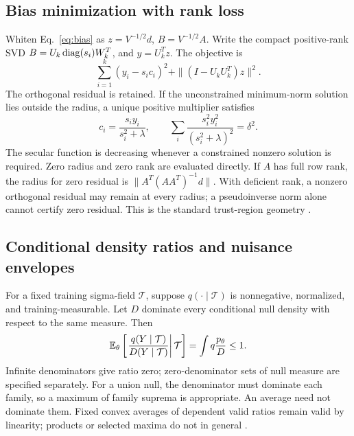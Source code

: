 \subsection{Bias minimization with rank loss}

Whiten Eq.~\eqref{eq:bias} as $z=V^{-1/2}d$, $B=V^{-1/2}A$. Write the compact positive-rank SVD $B=U_k\operatorname{diag}(s_i)W_k^T$, and $y=U_k^Tz$. The objective is
\begin{equation}
 \sum_{i=1}^k(y_i-s_ic_i)^2+
 \|(I-U_kU_k^T)z\|^2.
\end{equation}
The orthogonal residual is retained. If the unconstrained minimum-norm solution lies outside the radius, a unique positive multiplier satisfies
\begin{equation}
 c_i=\frac{s_iy_i}{s_i^2+\lambda},\qquad
 \sum_i\frac{s_i^2y_i^2}{(s_i^2+\lambda)^2}=\delta^2.
\end{equation}
The secular function is decreasing whenever a constrained nonzero solution is required. Zero radius and zero rank are evaluated directly. If $A$ has full row rank, the radius for zero residual is $\|A^T(AA^T)^{-1}d\|$. With deficient rank, a nonzero orthogonal residual may remain at every radius; a pseudoinverse norm alone cannot certify zero residual. This is the standard trust-region geometry \cite{MoreSorensen1983}.

\subsection{Conditional density ratios and nuisance envelopes}

For a fixed training sigma-field $\mathcal T$, suppose $q(\cdot\mid\mathcal T)$ is nonnegative, normalized, and training-measurable. Let $D$ dominate every conditional null density with respect to the same measure. Then
\begin{equation}
 \mathbb E_\theta\left[\left.\frac{q(Y\mid\mathcal T)}{D(Y\mid\mathcal T)}\right|\mathcal T\right]
 =\int q\frac{p_\theta}{D}\leq1.
\end{equation}
Infinite denominators give ratio zero; zero-denominator sets of null measure are specified separately. For a union null, the denominator must dominate each family, so a maximum of family suprema is appropriate. An average need not dominate them. Fixed convex averages of dependent valid ratios remain valid by linearity; products or selected maxima do not in general \cite{Wasserman2020}.

